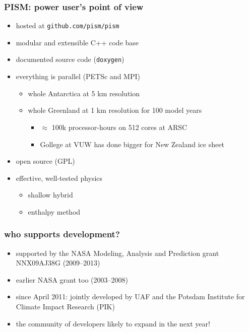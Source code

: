 \documentclass[hide notes,intlimits]{beamer}
\begin{document}
\begin{frame}
  \frametitle{PISM: power user's point of view}
  \begin{itemize}
  \item hosted at \texttt{github.com/pism/pism}
  \item modular and extensible C++ code base
  \item documented source code (\texttt{doxygen})
  \item everything is parallel (PETSc and MPI)
    \begin{itemize}
    \item whole Antarctica at 5 km resolution
    \item whole Greenland at 1 km resolution for 100 model years
      \begin{itemize}
      \item $\approx$ 100k processor-hours on 512 cores at ARSC
      \item Gollege at VUW has done bigger for New Zealand ice sheet
      \end{itemize}
    \end{itemize}
  \item open source (GPL)
  \item effective, well-tested physics
    \begin{itemize}
    \item shallow hybrid
    \item enthalpy method
   \end{itemize}
  \end{itemize}
\end{frame}


\begin{frame}
  \frametitle{who supports development?}
  \begin{itemize}
 \item supported by the NASA Modeling, Analysis and Prediction grant NNX09AJ38G
   (2009--2013)
   \item earlier NASA grant too (2003--2008)
  \item since April 2011: jointly developed by UAF and the Potsdam
    Institute for Climate Impact Research (PIK)
  \item the community of developers likely to expand in the next year!
  \end{itemize}
\end{frame}
\end{document}
